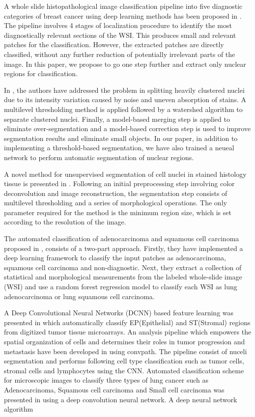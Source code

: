 \documentclass{comjnl}
\begin{document}
A whole slide histopathological image classification pipeline into five diagnostic categories of breast cancer using deep learning methods has been proposed in \cite{baris}. The pipeline involves 4 stages of localization procedure to identify the most diagnostically relevant sections of the WSI. This produces small and relevant patches for the classification. However, the extracted patches are directly classified, without any further reduction of potentially irrelevant parts of the image. In this paper, we propose to go one step further and extract only nuclear regions for classification.

In \cite{abdolhoseini}, the authors have addressed the problem in splitting heavily clustered nuclei due to its intensity variation caused by noise and uneven absorption of stains. A  multilevel thresholding method is applied followed by a watershed algorithm to separate clustered nuclei. Finally, a model-based merging step is applied to eliminate over-segmentation and a model-based correction step is used to improve segmentation results and eliminate small objects. In our paper, in addition to implementing a threshold-based segmentation, we have also trained a neueal network to perform automatic segmentation of nuclear regions.

A novel method for unsupervised segmentation of cell nuclei in stained histology tissue is presented in \cite{phoulady}. Following an initial preprocessing step involving color deconvolution and image reconstruction, the segmentation step consists of multilevel thresholding and a series of morphological operations. The only parameter required for the method is the minimum region size, which is set according to the resolution of the image.

The automated classification of adenocarcinoma and squamous cell carcinoma proposed in \cite{simon}, consists of a two-part approach. Firstly, they have implemented a deep learning framework to classify the input patches as adenocarcinoma, squamous cell carcinoma and non-diagnostic. Next, they extract a collection of statistical and morphological measurements from the labeled whole-slide image (WSI) and use a random forest regression model to classify each WSI as lung adenocarcinoma or lung squamous cell carcinoma.


A Deep Convolutional Neural Networks (DCNN) based feature learning was presented in \cite{xu2016deep} which automatically classify EP(Epithelial) and ST(Stromal) regions from digitized tumor tissue microarrays. An analysis pipeline which empowers the  spatial organization of cells and determines their roles in tumor progression and metastasis have been developed in \cite{wang2019convpath} using convpath. The pipeline consist of nuceli  segmentation and performs following cell type classification such as tumor cells, stromal cells and lymphocytes using the CNN. Automated classification scheme for microscopic images to classify three types of lung cancer such as Adenocarcinoma, Squamous cell carcinoma and  Small cell carcinoma was presented in \cite{teramoto2017automated}  using a deep convolution neural network. A deep neural network algorithm 
\end{document}
